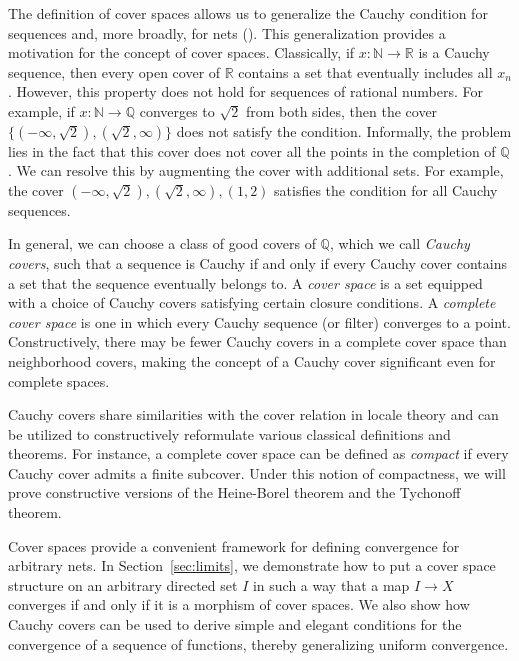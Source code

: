 \documentclass[reqno]{amsart}
\theoremstyle{definition}
\theoremstyle{remark}
\numberwithin{figure}{section}
\begin{document}
The definition of cover spaces allows us to generalize the Cauchy condition for sequences and, more broadly, for nets ().
This generalization provides a motivation for the concept of cover spaces.
Classically, if $x : \mathbb{N} \to \mathbb{R}$ is a Cauchy sequence, then every open cover of $\mathbb{R}$ contains a set that eventually includes all $x_n$.
However, this property does not hold for sequences of rational numbers.
For example, if $x : \mathbb{N} \to \mathbb{Q}$ converges to $\sqrt{2}$ from both sides, then the cover $\{ (-\infty,\sqrt{2}), (\sqrt{2},\infty) \}$ does not satisfy the condition.
Informally, the problem lies in the fact that this cover does not cover all the points in the completion of $\mathbb{Q}$.
We can resolve this by augmenting the cover with additional sets.
For example, the cover ${ (-\infty, \sqrt{2}), (\sqrt{2}, \infty), (1,2) }$ satisfies the condition for all Cauchy sequences.

In general, we can choose a class of good covers of $\mathbb{Q}$, which we call \emph{Cauchy covers},
such that a sequence is Cauchy if and only if every Cauchy cover contains a set that the sequence eventually belongs to.
A \emph{cover space} is a set equipped with a choice of Cauchy covers satisfying certain closure conditions.
A \emph{complete cover space} is one in which every Cauchy sequence (or filter) converges to a point.
Constructively, there may be fewer Cauchy covers in a complete cover space than neighborhood covers, making the concept of a Cauchy cover significant even for complete spaces.

Cauchy covers share similarities with the cover relation in locale theory and can be utilized to constructively reformulate various classical definitions and theorems.
For instance, a complete cover space can be defined as \emph{compact} if every Cauchy cover admits a finite subcover.
Under this notion of compactness, we will prove constructive versions of the Heine-Borel theorem and the Tychonoff theorem.

Cover spaces provide a convenient framework for defining convergence for arbitrary nets.
In Section~\ref{sec:limits}, we demonstrate how to put a cover space structure on an arbitrary directed set $I$ in such a way that a map $I \to X$ converges if and only if it is a morphism of cover spaces.
We also show how Cauchy covers can be used to derive simple and elegant conditions for the convergence of a sequence of functions, thereby generalizing uniform convergence.
\end{document}
